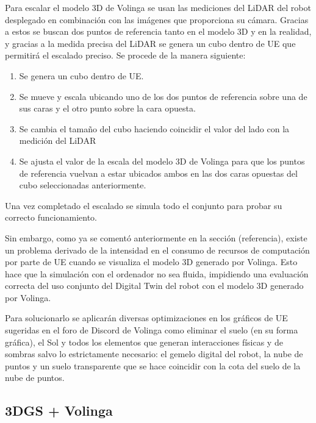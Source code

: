\documentclass[a4paper, 12pt, spanish, twoside]{article}
\begin{document}
Para escalar el modelo 3D de Volinga se usan las mediciones del LiDAR del robot desplegado en combinación con las imágenes que proporciona su cámara. Gracias a estos se buscan dos puntos de referencia tanto en el modelo 3D y en la realidad, y gracias a la medida precisa del LiDAR se genera un cubo dentro de UE que permitirá el escalado preciso. Se procede de la manera siguiente: 

\begin{enumerate} 

\item Se genera un cubo dentro de UE. 

\item Se mueve y escala ubicando uno de los dos puntos de referencia sobre una de sus caras y el otro punto sobre la cara opuesta. 

\item Se cambia el tamaño del cubo haciendo coincidir el valor del lado con la medición del LiDAR 

\item Se ajusta el valor de la escala del modelo 3D de Volinga para que los puntos de referencia vuelvan a estar ubicados ambos en las dos caras opuestas del cubo seleccionadas anteriormente. 

\end{enumerate} 

Una vez completado el escalado se simula todo el conjunto para probar su correcto funcionamiento. 

Sin embargo, como ya se comentó anteriormente en la sección (referencia), existe un problema derivado de la intensidad en el consumo de recursos de computación por parte de UE cuando se visualiza el modelo 3D generado por Volinga. Esto hace que la simulación con el ordenador no sea fluida, impidiendo una evaluación correcta del uso conjunto del Digital Twin del robot con el modelo 3D generado por Volinga. 

Para solucionarlo se aplicarán diversas optimizaciones en los gráficos de UE sugeridas en el foro de Discord de Volinga como eliminar el suelo (en su forma gráfica), el Sol y todos los elementos que generan interacciones físicas y de sombras salvo lo estrictamente necesario: el gemelo digital del robot, la nube de puntos y un suelo transparente que se hace coincidir con la cota del suelo de la nube de puntos. 

\subsection{3DGS + Volinga} 
\end{document}
